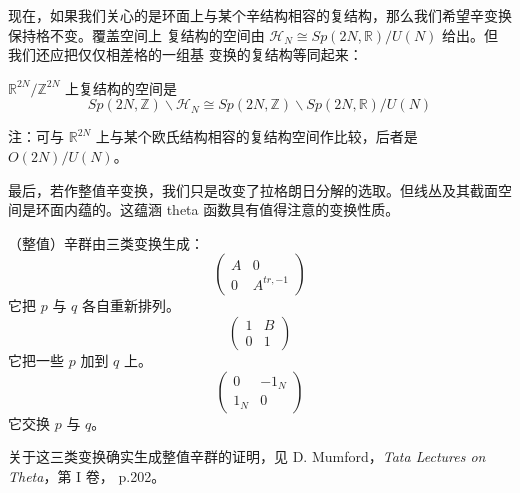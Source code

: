 现在，如果我们关心的是环面上与某个辛结构相容的复结构，那么我们希望辛变换保持格不变。覆盖空间上
复结构的空间由 $\mathcal{H}_N\cong Sp(2N,\mathbb{R})/U(N)$ 给出。但我们还应把仅仅相差格的一组基
变换的复结构等同起来：

\begin{theorem}
  $\mathbb{R}^{2N}/\mathbb{Z}^{2N}$ 上复结构的空间是
  \begin{equation}
    Sp(2N,\mathbb{Z})\backslash\mathcal{H}_N
    \cong Sp(2N,\mathbb{Z})\backslash Sp(2N,\mathbb{R})/U(N)
    \tag{E.42}
    \label{eq:E.42}
  \end{equation}
\end{theorem}

注：可与 $\mathbb{R}^{2N}$ 上与某个欧氏结构相容的复结构空间作比较，后者是 $O(2N)/U(N)$。

最后，若作整值辛变换，我们只是改变了拉格朗日分解的选取。但线丛及其截面空间是环面内蕴的。这蕴涵
theta 函数具有值得注意的变换性质。

（整值）辛群由三类变换生成：
\begin{equation}
  \begin{pmatrix} A & 0\\ 0 & A^{tr,-1}\end{pmatrix}
  \tag{E.43}
  \label{eq:E.43}
\end{equation}
它把 $p$ 与 $q$ 各自重新排列。
\begin{equation}
  \begin{pmatrix} 1 & B\\ 0 & 1\end{pmatrix}
  \tag{E.44}
  \label{eq:E.44}
\end{equation}
它把一些 $p$ 加到 $q$ 上。
\begin{equation}
  \begin{pmatrix} 0 & -1_N\\ 1_N & 0\end{pmatrix}
  \tag{E.45}
  \label{eq:E.45}
\end{equation}
它交换 $p$ 与 $q$。

关于这三类变换确实生成整值辛群的证明，见 D. Mumford，\textit{Tata Lectures on Theta}，第 I 卷，
p.202。
